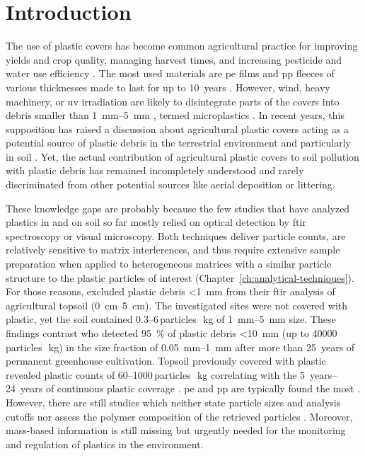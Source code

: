 \section{Introduction}

The use of plastic covers has become common agricultural practice for improving yields and crop quality, managing harvest times, and increasing pesticide and water use efficiency \citep[Chapter~\ref{ch:plastic-mulching};][]{LamontPlastic1993}. The most used materials are \ac{pe} films and \ac{pp} fleeces of various thicknesses made to last for up to \SI{10}{years} \citep{BertlingKunststoffe2021}. However, wind, heavy machinery, or \ac{uv} irradiation are likely to disintegrate parts of the covers into debris smaller than \SIrange{1}{5}{\milli\meter} \citep{Scarascia-MugnozzaPlastic2011}, termed microplastics \citep{HartmannAre2019}. In recent years, this supposition has raised a discussion about agricultural plastic covers acting as a potential source of plastic debris in the terrestrial environment and particularly in soil \citep[Chapter~\ref{ch:plastic-mulching};][]{HurleyFate2018}. Yet, the actual contribution of agricultural plastic covers to soil pollution with plastic debris has remained incompletely understood and rarely discriminated from other potential sources like aerial deposition or littering.

These knowledge gaps are probably because the few studies that have analyzed plastics in and on soil so far mostly relied on optical detection by \ac{ftir} spectroscopy or visual microscopy. Both techniques deliver particle counts, are relatively sensitive to matrix interferences, and thus require extensive sample preparation when applied to heterogeneous matrices with a similar particle structure to the plastic particles of interest (Chapter~\ref{ch:analytical-techniques}). For those reasons, \citet{PiehlIdentification2018,HarmsAmount2021} excluded plastic debris \SI{<1}{\milli\meter} from their \ac{ftir} analysis of agricultural topsoil (\SIrange{0}{5}{\centi\meter}). The investigated sites were not covered with plastic, yet the soil contained \numrange[range-phrase={ to }]{0.3}{6}\,particles\,\si{\per\kilo\gram} of \SIrange{1}{5}{\milli\meter} size. These findings contrast \citet{ZhangDistribution2018} who detected \SI{95}{\percent} of plastic debris \SI{<10}{\milli\meter} (up to \num{40000}\,particles\,\si{\per\kilo\gram}) in the size fraction of \SIrange{0.05}{1}{\milli\meter} after more than \SI{25}{years} of permanent greenhouse cultivation. Topsoil previously covered with plastic revealed plastic counts of \numrange[range-phrase={ up to }]{60}{1000}\,particles\,\si{\per\kilo\gram} correlating with the \SIrange{5}{24}{years} of continuous plastic coverage \citep{HuangAgricultural2020}. \ac{pe} and \ac{pp} are typically found the most \citep{HarmsAmount2021,KimAbundance2021}. However, there are still studies which neither state particle sizes and analysis cutoffs nor assess the polymer composition of the retrieved particles \citep[for example,][]{ZhangSimple2018,BeriotLow2021}. Moreover, mass-based information is still missing but urgently needed for the monitoring and regulation of plastics in the environment.

